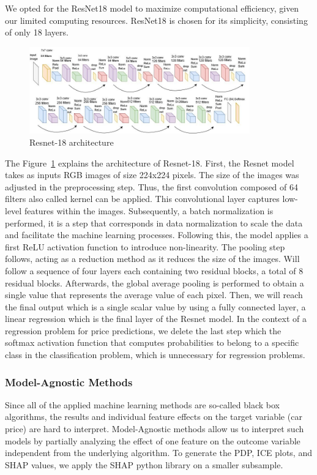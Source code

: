 \documentclass[12pt]{article}
\begin{document}
\noindent We opted for the ResNet18 model to maximize computational efficiency, given our limited computing resources. ResNet18 is chosen for its simplicity, consisting of only 18 layers.

\FloatBarrier
\begin{figure}[ht]
    \centering
    \includegraphics[width=0.85\textwidth]{resnet18.jpeg}
    \caption{Resnet-18 architecture}
    \label{Resnet18}
\end{figure}
\FloatBarrier

\noindent The Figure~\ref{Resnet18} explains the architecture of Resnet-18.
First, the Resnet model takes as inputs RGB images of size 224x224 pixels. The size of the images was adjusted in the preprocessing step. Thus, the first convolution composed of 64 filters also called kernel can be applied. This convolutional layer captures low-level features within the images. Subsequently, a batch normalization is performed, it is a step that corresponds in data normalization to scale the data and facilitate the machine learning processes. Following this, the model applies a first ReLU activation function to introduce non-linearity. The pooling step follows, acting as a reduction method as it reduces the size of the images. 
Will follow a sequence of four layers each containing two residual blocks, a total of 8 residual blocks.
Afterwards, the global average pooling is performed to obtain a single value that represents the average value of each pixel.  Then, we will reach the final output which is a single scalar value by using a fully connected layer, a linear regression which is the final layer of the Resnet model. In the context of a regression problem for price predictions, we delete the last step which the softmax activation function that computes probabilities to belong to a specific class in the classification problem, which is unnecessary for regression problems.\\



\subsubsection{Model-Agnostic Methods}
Since all of the applied machine learning methods are so-called black box algorithms, the results and individual feature effects on the target variable (car price) are hard to interpret. Model-Agnostic methods allow us to interpret such models by partially analyzing the effect of one feature on the outcome variable independent from the underlying algorithm. To generate the PDP, ICE plots, and SHAP values, we apply the SHAP python library on a smaller subsample. \\
\end{document}
